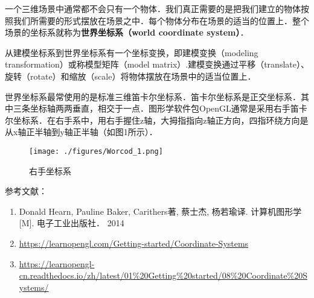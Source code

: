 

一个三维场景中通常都不会只有一个物体．我们真正需要的是把我们建立的物体按照我们所需要的形式摆放在场景之中．每个物体分布在场景的适当的位置上．整个场景的坐标系就称为\textbf{世界坐标系（world coordinate system）}．

从建模坐标系到世界坐标系有一个坐标变换，即建模变换（modeling transformation）或称模型矩阵（model matrix）.建模变换通过平移（translate）、旋转（rotate）和缩放（scale）将物体摆放在场景中的适当位置上．

世界坐标系最常使用的是标准三维笛卡尔坐标系．笛卡尔坐标系是正交坐标系．其中三条坐标轴两两垂直，相交于一点．图形学软件包OpenGL通常是采用右手笛卡尔坐标系．在右手系中，用右手握住z轴，大拇指指向z轴正方向，四指环绕方向是从x轴正半轴到y轴正半轴（如图1所示）．


\begin{figure}[ht]
\centering
\texttt{[image: ./figures/Worcod\_1.png]}
\caption{右手坐标系} \label{Worcod_fig1}
\end{figure}



参考文献：
\begin{enumerate}
\item Donald Hearn, Pauline Baker, Carithers著, 蔡士杰, 杨若瑜译. 计算机图形学[M]. 电子工业出版社． 2014
\item \href{https://learnopengl.com/Getting-started/Coordinate-Systems}{https://learnopengl.com/Getting-started/Coordinate-Systems}
\item \href{https://learnopengl-cn.readthedocs.io/zh/latest/01\%20Getting\%20started/08\%20Coordinate\%20Systems/}{https://learnopengl-cn.readthedocs.io/zh/latest/01\%20Getting\%20started/08\%20Coordinate\%20Systems/}
\end{enumerate}